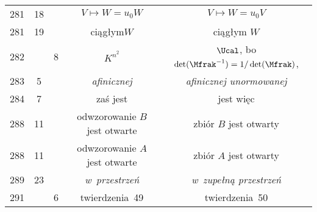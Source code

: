 \documentclass[a4paper,11pt]{article}
\numberwithin{equation}{section}
\begin{document}
\begin{center}
\begin{tabular}{|c|c|c|c|c|}
    281 & 18 & & $V \mapsto W = u_{ 0 } W$ & $V \mapsto W = u_{ 0 } V$ \\
    281 & 19 & & ciągłym$W$ & ciągłym $W$ \\
    282 & &  8 & $K^{ n^{ 2 } }$
           & $\Ucal$, bo $\det( \Mfrak^{ -1 } ) = 1 / \det( \Mfrak )$, \\
    283 &  5 & & \textit{afinicznej} & \textit{afinicznej unormowanej} \\
    284 &  7 & & zaś jest & jest więc \\
    288 & 11 & & odwzorowanie $B$ jest otwarte & zbiór $B$ jest otwarty \\
    288 & 11 & & odwzorowanie $A$ jest otwarte & zbiór $A$ jest otwarty \\
    289 & 23 & & \textit{w~przestrzeń} & \textit{w~zupełną przestrzeń} \\
    291 & &  6 & twierdzenia~49 & twierdzenia~50 \\
    \hline
  \end{tabular}






\end{center}
\end{document}
